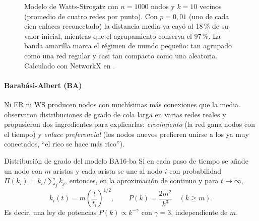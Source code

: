 \begin{figure}[t]
\centering
{}
\caption[El régimen de mundo pequeño]{Modelo de Watts-Strogatz con $n=1000$ nodos y $k=10$ vecinos (promedio de cuatro redes por punto). Con $p=0{,}01$ (uno de cada cien enlaces reconectado) la distancia media ya cayó al 18\,\% de su valor inicial, mientras que el agrupamiento conserva el 97\,\%. La banda amarilla marca el régimen de mundo pequeño: tan agrupado como una red regular y casi tan compacto como una aleatoria. Calculado con NetworkX en .}
\label{fig:16-ws}
\end{figure}

\paragraph{Barabási-Albert (BA)} Ni ER ni WS producen nodos con muchísimas más conexiones que la media. \textcite{c16-barabasi1999} observaron distribuciones de grado de cola larga en varias redes reales y propusieron dos ingredientes para explicarlas: \emph{crecimiento} (la red gana nodos con el tiempo) y \emph{enlace preferencial} (los nodos nuevos prefieren unirse a los ya muy conectados, ``el rico se hace más rico'').

\begin{teorema}{Distribución de grado del modelo BA}{16-ba}
Si en cada paso de tiempo se añade un nodo con $m$ aristas y cada arista se une al nodo $i$ con probabilidad $\Pi(k_i)=k_i/\sum_j k_j$, entonces, en la aproximación de continuo y para $t\to\infty$,
\begin{equation}\label{eq:16-ba}
k_i(t)=m\left(\frac{t}{t_i}\right)^{1/2},\qquad P(k)=\frac{2m^2}{k^{3}}\quad (k\ge m).
\end{equation}
Es decir, una ley de potencias $P(k)\propto k^{-\gamma}$ con $\gamma=3$, independiente de $m$.
\end{teorema}
\begin{simbolos}
\end{simbolos}

